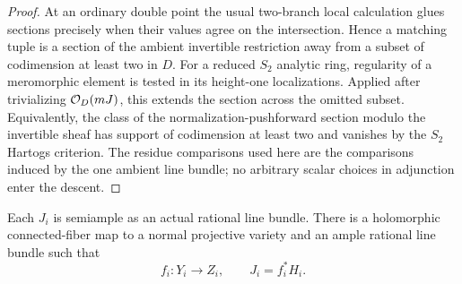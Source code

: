 \begin{proof}
At an ordinary double point the usual two-branch local calculation
glues sections precisely when their values agree on the intersection.
Hence a matching tuple is a section of the ambient invertible
restriction away from a subset of codimension at least two in $D$.
For a reduced $S_2$ analytic ring, regularity of a meromorphic element
is tested in its height-one localizations.  Applied after trivializing
$\mathcal{O}_D(mJ)$, this extends the section across the omitted subset.
Equivalently, the class of the normalization-pushforward section
modulo the invertible sheaf has support of codimension at least two
and vanishes by the $S_2$ Hartogs criterion.  The residue comparisons
used here are the comparisons induced by the one ambient line bundle;
no arbitrary scalar choices in adjunction enter the descent.
\end{proof}

\begin{lemma}
\label{floor:component-systems}
Each $J_i$ is semiample as an actual rational line bundle.  There is a
holomorphic connected-fiber map to a normal projective variety and an
ample rational line bundle such that
\begin{equation}
 \label{floor:stein-system}
 f_i:Y_i\longrightarrow Z_i,\qquad J_i=f_i^*H_i.
\end{equation}
\end{lemma}

